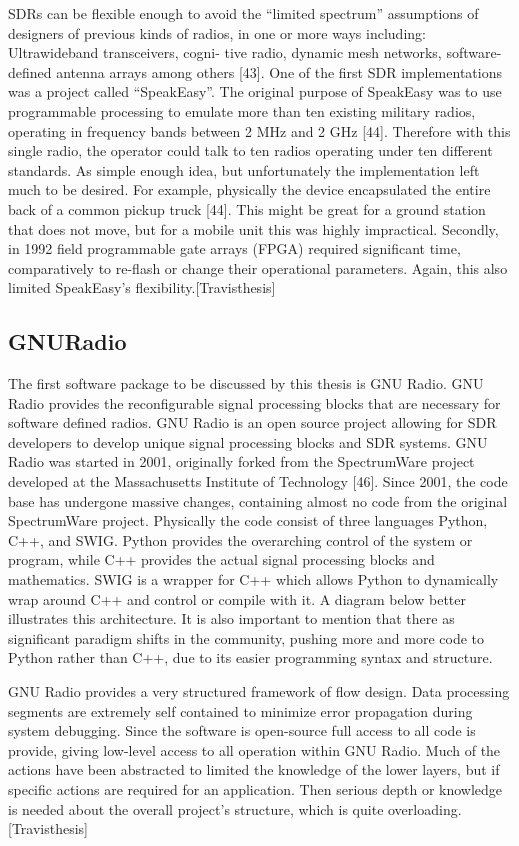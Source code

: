 SDRs can be flexible enough to avoid the “limited spectrum” assumptions of designers of previous kinds of radios, in one or more ways including: Ultrawideband transceivers, cogni-
tive radio, dynamic mesh networks, software-defined antenna arrays among others [43]. One of the first SDR implementations was a project called “SpeakEasy”. The original purpose of
SpeakEasy was to use programmable processing to emulate more than ten existing military radios, operating in frequency bands between 2 MHz and 2 GHz [44]. Therefore with this
single radio, the operator could talk to ten radios operating under ten different standards. As simple enough idea, but unfortunately the implementation left much to be desired. For
example, physically the device encapsulated the entire back of a common pickup truck [44]. This might be great for a ground station that does not move, but for a mobile unit this
was highly impractical. Secondly, in 1992 field programmable gate arrays (FPGA) required significant time, comparatively to re-flash or change their operational parameters. Again,
this also limited SpeakEasy’s flexibility.[Travisthesis]


\subsection{GNURadio}
The first software package to be discussed by this thesis is GNU Radio. GNU Radio provides the reconfigurable signal processing blocks that are necessary for software defined
radios. GNU Radio is an open source project allowing for SDR developers to develop unique signal processing blocks and SDR systems. GNU Radio was started in 2001, originally
forked from the SpectrumWare project developed at the Massachusetts Institute of Technology [46]. Since 2001, the code base has undergone massive changes, containing almost
no code from the original SpectrumWare project. Physically the code consist of three languages Python, C++, and SWIG. Python provides the overarching control of the system or
program, while C++ provides the actual signal processing blocks and mathematics. SWIG is a wrapper for C++ which allows Python to dynamically wrap around C++ and control
or compile with it. A diagram below better illustrates this architecture. It is also important to mention that there as significant paradigm shifts in the community, pushing more and
more code to Python rather than C++, due to its easier programming syntax and structure.

GNU Radio provides a very structured framework of flow design. Data processing segments are extremely self contained to minimize error propagation during system debugging.
Since the software is open-source full access to all code is provide, giving low-level access to all operation within GNU Radio. Much of the actions have been abstracted to limited the
knowledge of the lower layers, but if specific actions are required for an application. Then serious depth or knowledge is needed about the overall project’s structure, which is quite
overloading.[Travisthesis]


